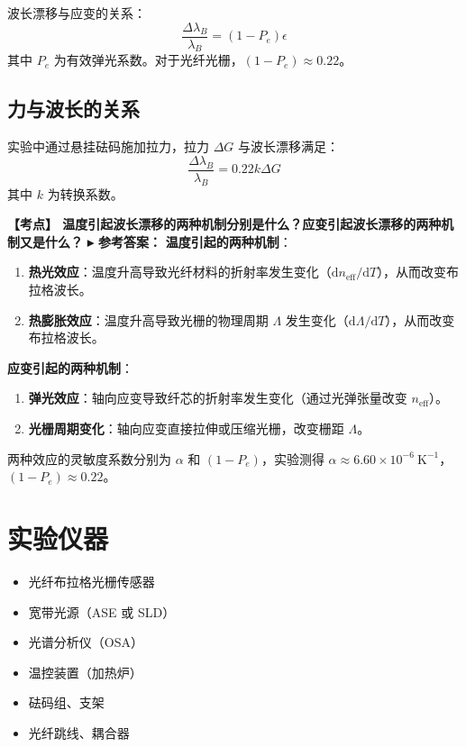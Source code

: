 \documentclass[12pt,a4paper]{article}
\newcommand{\exam}[1]{\textbf{\color{blue!70!black}【考点】#1}}
\newcommand{\answer}[1]{\vspace{2pt}\noindent\textbf{\color{teal!80!black}▸ 参考答案：}#1\vspace{4pt}}
\newcommand{\qa}[2]{\exam{#1}\answer{#2}}
\begin{document}
波长漂移与应变的关系：
\begin{equation}
    \frac{\Delta \lambda_B}{\lambda_B} = (1-P_e)\epsilon
\end{equation}
其中 \(P_e\) 为有效弹光系数。对于光纤光栅，\((1-P_e) \approx 0.22\)。

\subsection{力与波长的关系}
实验中通过悬挂砝码施加拉力，拉力 \(\Delta G\) 与波长漂移满足：
\begin{equation}
    \frac{\Delta \lambda_B}{\lambda_B} = 0.22 k \Delta G
\end{equation}
其中 \(k\) 为转换系数。

\qa{
    温度引起波长漂移的两种机制分别是什么？应变引起波长漂移的两种机制又是什么？
}{
    \noindent\textbf{温度引起的两种机制}：
    \begin{enumerate}
        \item \textbf{热光效应}：温度升高导致光纤材料的折射率发生变化（$\mathrm{d}n_{\text{eff}}/\mathrm{d}T$），从而改变布拉格波长。
        \item \textbf{热膨胀效应}：温度升高导致光栅的物理周期 $\Lambda$ 发生变化（$\mathrm{d}\Lambda/\mathrm{d}T$），从而改变布拉格波长。
    \end{enumerate}

    \noindent\textbf{应变引起的两种机制}：
    \begin{enumerate}
        \item \textbf{弹光效应}：轴向应变导致纤芯的折射率发生变化（通过光弹张量改变 $n_{\text{eff}}$）。
        \item \textbf{光栅周期变化}：轴向应变直接拉伸或压缩光栅，改变栅距 $\Lambda$。
    \end{enumerate}
    两种效应的灵敏度系数分别为 $\alpha$ 和 $(1-P_e)$，实验测得 $\alpha \approx 6.60\times10^{-6}\ \text{K}^{-1}$，$(1-P_e) \approx 0.22$。
}

\section{实验仪器}
\begin{itemize}
    \item 光纤布拉格光栅传感器
    \item 宽带光源（ASE 或 SLD）
    \item 光谱分析仪（OSA）
    \item 温控装置（加热炉）
    \item 砝码组、支架
    \item 光纤跳线、耦合器
\end{itemize}
\end{document}
